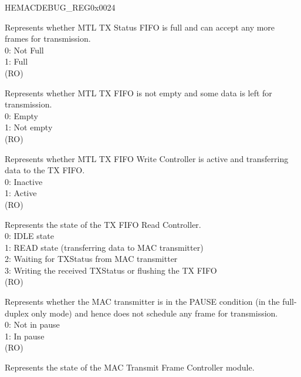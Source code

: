 \begin{register}{H}{EMACDEBUG\_REG}{0x0024}\label{regdesc:EMACDEBUGREG}
%
%
%
%
%
%
%
%
%
%
%
%
%
%
%
%
%
\regnewline%
\begin{regdesc}\begin{reglist}
\item [MTLTSFFS] Represents whether MTL TX Status FIFO is full and can accept any more frames for transmission.\\
0: Not Full\\
1: Full\\ (RO)
\item [MTLTFNES] Represents whether MTL TX FIFO is not empty and some data is left for transmission.\\
0: Empty\\
1: Not empty\\(RO)
\item [MTLTFWCS] Represents whether MTL TX FIFO  Write Controller is active and transferring data to the TX FIFO.\\
0: Inactive\\
1: Active\\(RO)
\item [MTLTFRCS] Represents the state of the TX FIFO Read Controller.\\
0: IDLE state\\
1: READ state (transferring data to MAC transmitter)\\
2: Waiting for TXStatus from MAC transmitter\\
3: Writing the received TXStatus or flushing the TX FIFO\\
(RO)
\item [MACTP] Represents whether the MAC transmitter is in the PAUSE condition (in the full-duplex only mode) and hence does not schedule any frame for transmission.\\
0: Not in pause\\
1: In pause\\
(RO)
\item [MACTFCS] Represents the state of the MAC Transmit Frame Controller module.\\

\end{reglist}
\end{regdesc}
\end{register}
